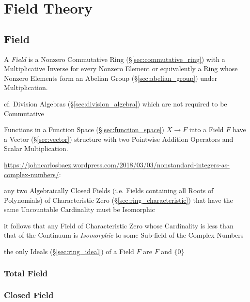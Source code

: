 


\section{Field Theory}\label{sec:field_theory}

\subsection{Field}\label{sec:field}

A \emph{Field} is a Nonzero Commutative Ring
(\S\ref{sec:commutative_ring}) with a Multiplicative Inverse for every
Nonzero Element or equivalently a Ring whose Nonzero Elements form an
Abelian Group (\S\ref{sec:abelian_group}) under Multiplication.

cf. Division Algebras (\S\ref{sec:division_algebra}) which are not required to
be Commutative

Functions in a Function Space (\S\ref{sec:function_space}) $X
\rightarrow F$ into a Field $F$ have a Vector (\S\ref{sec:vector})
structure with two Pointwise Addition Operators and Scalar
Multiplication.

\url{https://johncarlosbaez.wordpress.com/2018/03/03/nonstandard-integers-as-complex-numbers/}:

any two Algebraically Closed Fields (i.e. Fields containing all Roots of
Polynomials) of Characteristic Zero (\S\ref{sec:ring_characteristic}) that have
the same Uncountable Cardinality must be Isomorphic

it follows that any Field of Characteristic Zero whose Cardinality is less than
that of the Continuum is \emph{Isomorphic} to some Sub-field of the Complex
Numbers

the only Ideals (\S\ref{sec:ring_ideal}) of a Field $F$ are $F$ and $\{0\}$



\subsubsection{Total Field}\label{sec:total_field}

\subsubsection{Closed Field}\label{sec:closed_field}

